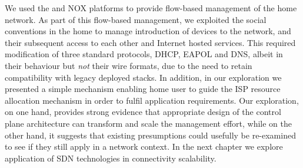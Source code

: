 We used the \ovs and NOX platforms to provide flow-based management of the home
network.  As part of this flow-based management, we exploited the social
conventions in the home to manage introduction of devices  to the network, and
their subsequent access to each other and Internet hosted services.  This
required modification of three standard protocols, DHCP, EAPOL and DNS, albeit
in their behaviour but \emph{not} their wire formats, due to the need to retain
compatibility with legacy deployed stacks. In addition, in our exploration we
presented a simple mechanism enabling home user to guide the ISP resource
allocation mechanism in order to fulfil application requirements.  Our
exploration, on one hand, provides strong evidence that appropriate design of
the control plane architecture can transform and scale the management effort,
while on the other hand, it suggests that existing presumptions could usefully
be re-examined to see if they still apply in a network context.  In the next
chapter we explore application of SDN technologies in connectivity scalability. 

